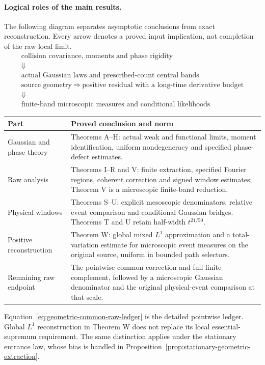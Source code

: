 \documentclass[11pt,reqno]{amsart}
\numberwithin{equation}{section}
\theoremstyle{definition}\newtheorem{definition}[theorem]{Definition}
\theoremstyle{remark}\newtheorem{remark}[theorem]{Remark}
\begin{document}
\paragraph{Logical roles of the main results.}
The following diagram separates asymptotic conclusions from exact
reconstruction. Every arrow denotes a proved input implication, not
completion of the raw local limit.
\[
\begin{array}{c}
\text{collision covariance, moments and phase rigidity}\\
\Downarrow\\
\text{actual Gaussian laws and prescribed-count central bands}\\[2mm]
\text{source geometry}\ \Longrightarrow\
\text{positive residual with a long-time derivative budget}\\
\Downarrow\\
\text{finite-band microscopic measures and conditional likelihoods}
\end{array}
\]
\begin{center}
\begin{tabular}{p{}p{}}
\hline
Part & Proved conclusion and norm\\
\hline
Gaussian and phase theory & Theorems A--H: actual weak and functional
limits, moment identification, uniform nondegeneracy and specified
phase-defect estimates.\\
Raw analysis & Theorems I--R and V: finite extraction, specified
Fourier regions, coherent correction and signed window estimates;
Theorem V is a microscopic finite-band reduction.\\
Physical windows & Theorems S--U: explicit mesoscopic denominators,
relative event comparison and conditional Gaussian bridges.
Theorems T and U retain half-width $t^{21/50}$.\\
Positive reconstruction & Theorem W: global mixed $L^1$ approximation
and a total-variation estimate for microscopic event measures on the
original source, uniform in bounded path selectors.\\
Remaining raw endpoint & The pointwise common correction and full
finite complement, followed by a microscopic Gaussian denominator
and the original physical-event comparison at that scale.\\
\hline
\end{tabular}
\end{center}
Equation~\eqref{eq:geometric-common-raw-ledger} is the detailed pointwise
ledger. Global $L^1$ reconstruction in Theorem W does not replace its
local essential-supremum requirement. The same distinction applies
under the stationary entrance law, whose bias is handled in
Proposition~\ref{prop:stationary-geometric-extraction}.
\end{document}
